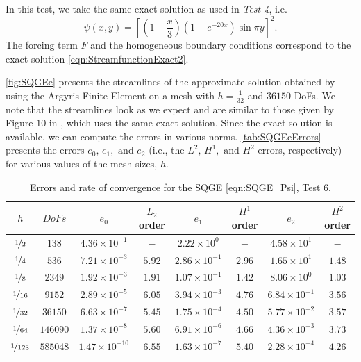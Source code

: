 In this test, we take the same exact solution as used in \emph{Test 4}, i.e.
\begin{equation}
  \psi(x,y) = \left[\left(1 - \frac{x}{3}\right)\left(1-e^{-20x}\right) \sin \pi y\right]^2.
  \label{eqn:StreamfunctionExact2}
\end{equation}
The forcing term $F$ and the homogeneous boundary conditions correspond to the exact solution
\eqref{eqn:StreamfunctionExact2}.

\autoref{fig:SQGEe} presents the streamlines of the approximate solution
obtained by using the Argyris Finite Element on a mesh with $h=\frac{1}{32}$ and
$36150$ DoFs. We note that the streamlines look as we expect and are similar to
those given by Figure $10$ in \cite{Myers}, which uses the same exact solution.
Since the exact solution is available, we can compute the errors in various
norms. \autoref{tab:SQGEeErrors} presents the errors $e_0,\, e_1, \text{ and }
e_2$ (i.e., the $L^2,\, H^1, \text{ and } H^2$ errors, respectively) for various
values of the mesh sizes, $h$.

\begin{table}%
\begin{center}
\begin{tabular}{|c|c|c|c|c|c|c|c|}%
  \hline
  $h$ & $DoFs$ & $e_0$ & $L_2$ order & $e_1$ & $H^1$ order & $e_2$ & $H^2$ order \\[0.2em] %
  \hline
  $\nicefrac{1}{2}$ & $138$ & $4.36\times 10^{-1}$ & $-$ & $2.22\times 10^0$ & $-$ & $4.58\times 10^1$ & $-$\\
  $\nicefrac{1}{4}$ & $536$ & $7.21\times 10^{-3}$ & $5.92$ & $2.86\times 10^{-1}$ & $2.96$ & $1.65\times 10^1$ & $1.48$\\
  $\nicefrac{1}{8}$ & $2349$ & $1.92\times 10^{-3}$ & $1.91$ & $1.07\times 10^{-1}$ & $1.42$ & $8.06\times 10^{0}$ & $1.03$\\
  $\nicefrac{1}{16}$ & $9152$ & $2.89\times 10^{-5}$ & $6.05$ & $3.94\times 10^{-3}$ & $4.76$ & $6.84\times 10^{-1}$ & $3.56$\\
  $\nicefrac{1}{32}$ & $36150$ & $6.63\times 10^{-7}$ & $5.45$ & $1.75\times 10^{-4}$ & $4.50$ & $5.77\times 10^{-2}$ & $3.57$\\
  $\nicefrac{1}{64}$ & $146090$ & $1.37\times 10^{-8}$ & $5.60$ & $6.91\times 10^{-6}$ & $4.66$ & $4.36\times 10^{-3}$ & $3.73$\\
  $\nicefrac{1}{128}$ & $585048$ & $1.47\times 10^{-10}$ & $6.55$ & $1.63\times 10^{-7}$ & $5.40$ & $2.28\times 10^{-4}$ & $4.26$ \\
 \hline
\end{tabular}
\end{center}
\caption{Errors and rate of convergence for the SQGE \eqref{eqn:SQGE_Psi}, Test 6.}
\label{tab:SQGEeErrors}
\end{table}

